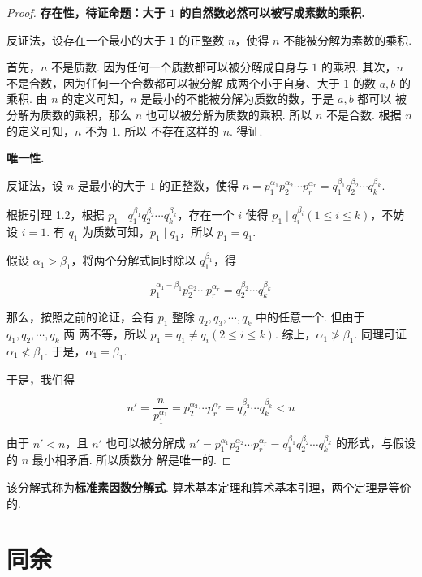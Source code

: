 \documentclass[a4paper]{article}
\begin{document}
\begin{proof}
    \textbf{存在性，待证命题：大于 $1$ 的自然数必然可以被写成素数的乘积. }

    反证法，设存在一个最小的大于 $1$ 的正整数 $n$，使得 $n$ 不能被分解为素数的乘积.

    首先，$n$ 不是质数. 因为任何一个质数都可以被分解成自身与 $1$ 的乘积. 其次，$n$ 不是合数，因为任何一个合数都可以被分解
    成两个小于自身、大于 $1$ 的数 $a,b$ 的乘积. 由 $n$ 的定义可知，$n$ 是最小的不能被分解为质数的数，于是 $a,b$ 都可以
    被分解为质数的乘积，那么 $n$ 也可以被分解为质数的乘积. 所以 $n$ 不是合数. 根据 $n$ 的定义可知，$n$ 不为 $1$. 所以
    不存在这样的 $n$. 得证.

    \textbf{唯一性. }

    反证法，设 $n$ 是最小的大于 $1$ 的正整数，使得 $n=p_1^{\alpha_1}p_2^{\alpha_2}\cdots p_r^{\alpha_r}
        =q_1^{\beta_1}q_2^{\beta_2}\cdots q_k^{\beta_k}$.

    根据引理 1.2，根据 $p_1\mid q_1^{\beta_1}q_2^{\beta_2}\cdots q_k^{\beta_k}$，存在一个 $i$ 使得 $p_1
        \mid q_i^{\beta_i}(1\le i\le k)$，不妨设 $i=1$. 有 $q_1$ 为质数可知，$p_1\mid q_1$，所以 $p_1=q_1$.

    假设 $\alpha_1>\beta_1$，将两个分解式同时除以 $q_1^{\beta_1}$，得

    $$
        p_1^{\alpha_1-\beta_1}p_2^{\alpha_2}\cdots p_r^{\alpha_r}=q_2^{\beta_2}\cdots q_k^{\beta_k}
    $$

    那么，按照之前的论证，会有 $p_1$ 整除 $q_2,q_3,\cdots,q_k$ 中的任意一个. 但由于 $q_1,q_2,\cdots,q_k$ 两
    两不等，所以 $p_1=q_1\ne q_i(2\le i\le k)$. 综上，$\alpha_1\not>\beta_1$. 同理可证 $\alpha_1\not<
        \beta_1$. 于是，$\alpha_1=\beta_1$.

    于是，我们得

    $$
        n'=\frac{n}{p_1^{\alpha_1}}=p_2^{\alpha_2}\cdots p_r^{\alpha_r}=q_2^{\beta_2}\cdots q_k^{\beta_k}
        <n
    $$

    由于 $n'<n$，且 $n'$ 也可以被分解成 $n'=p_1^{\alpha_1}p_2^{\alpha_2}\cdots p_r^{\alpha_r}
        =q_1^{\beta_1}q_2^{\beta_2}\cdots q_k^{\beta_k}$ 的形式，与假设的 $n$ 最小相矛盾. 所以质数分
    解是唯一的.
\end{proof}

该分解式称为\textbf{标准素因数分解式}. 算术基本定理和算术基本引理，两个定理是等价的.

\newpage

\section{同余}
\end{document}
